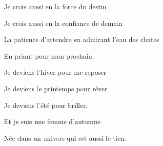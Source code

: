 {\medskip

Je crois aussi en la force du destin

Je crois aussi en la confiance de demain

La patience d’attendre en admirant l’eau des chutes

En priant pour mon prochain.

\medskip

Je deviens l’hiver pour me reposer

Je deviens le printemps pour rêver

Je deviens l’été pour briller.

\medskip

Et je suis une femme d’automne

Née dans un univers qui est aussi le tien.
\setlength{\parskip}{6pt}}


